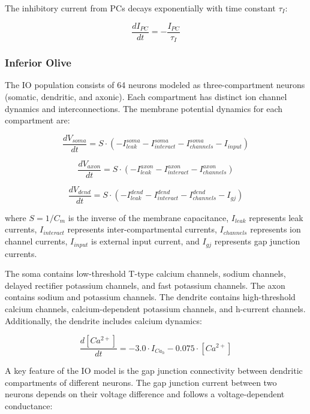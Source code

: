 The inhibitory current from PCs decays exponentially with time constant $\tau_I$:

\begin{equation}
\frac{dI_{PC}}{dt} = -\frac{I_{PC}}{\tau_I}
\end{equation}

\subsubsection{Inferior Olive}

The IO population consists of 64 neurons modeled as three-compartment neurons (somatic, dendritic, and axonic). Each compartment has distinct ion channel dynamics and interconnections. The membrane potential dynamics for each compartment are:

\begin{equation}
\frac{dV_{soma}}{dt} = S \cdot (-I_{leak}^{soma} - I_{interact}^{soma} - I_{channels}^{soma} - I_{input})
\end{equation}

\begin{equation}
\frac{dV_{axon}}{dt} = S \cdot (-I_{leak}^{axon} - I_{interact}^{axon} - I_{channels}^{axon})
\end{equation}

\begin{equation}
\frac{dV_{dend}}{dt} = S \cdot (-I_{leak}^{dend} - I_{interact}^{dend} - I_{channels}^{dend} - I_{gj})
\end{equation}

where $S = 1/C_m$ is the inverse of the membrane capacitance, $I_{leak}$ represents leak currents, $I_{interact}$ represents inter-compartmental currents, $I_{channels}$ represents ion channel currents, $I_{input}$ is external input current, and $I_{gj}$ represents gap junction currents.

The soma contains low-threshold T-type calcium channels, sodium channels, delayed rectifier potassium channels, and fast potassium channels. The axon contains sodium and potassium channels. The dendrite contains high-threshold calcium channels, calcium-dependent potassium channels, and h-current channels. Additionally, the dendrite includes calcium dynamics:

\begin{equation}
\frac{d[Ca^{2+}]}{dt} = -3.0 \cdot I_{Ca_h} - 0.075 \cdot [Ca^{2+}]
\end{equation}

A key feature of the IO model is the gap junction connectivity between dendritic compartments of different neurons. The gap junction current between two neurons depends on their voltage difference and follows a voltage-dependent conductance:

